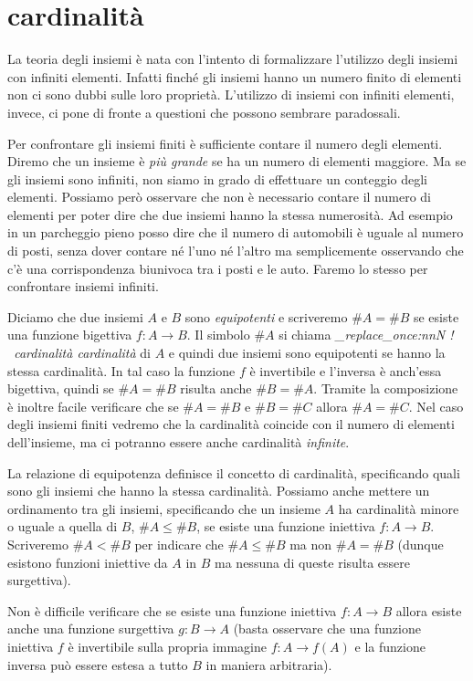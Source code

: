 \documentclass[italian,a4paper,twosides,headinclude]{scrbook}
\newcommand\stripExclamation[1]{
\def\tmp{#1}
\regex_replace_once:nnN { ! } { \  }\tmp
\tmp}
\newcommand{\mynote}[1]{\marginnote{{\footnotesize\stripExclamation{#1}}}}
\newcommand{\myemph}[2][]{%
  \emph{\stripExclamation{#2}}%
  \ifthenelse{\isempty{#1}}%
    {\mynote{#2}%
    \index{#2}}%
    {\mynote{#2}%
     \ifthenelse{\isempty{}}%
      {\index{#2}}%
      {\index{}}}}%
\begin{document}
\section{cardinalità}

La teoria degli insiemi è nata con l'intento di formalizzare l'utilizzo degli
insiemi con infiniti elementi. Infatti finché gli insiemi hanno un numero finito
di elementi non ci sono dubbi sulle loro proprietà. L'utilizzo di insiemi con
infiniti elementi, invece, ci pone di fronte a questioni che possono sembrare
paradossali.

Per confrontare gli insiemi finiti è sufficiente contare il numero degli elementi.
Diremo che un insieme è \emph{più grande} se ha un numero di elementi maggiore.
Ma se gli insiemi sono infiniti, non siamo in grado di effettuare un conteggio
degli elementi. Possiamo però osservare che non è necessario contare il numero
di elementi per poter dire che due insiemi hanno la stessa numerosità.
Ad esempio in un parcheggio pieno posso dire che il numero di automobili
è uguale al numero di posti, senza dover contare né l'uno né l'altro ma semplicemente
osservando che c'è una corrispondenza biunivoca tra i posti e le auto. Faremo
lo stesso per confrontare insiemi infiniti.

Diciamo che due insiemi $A$ e $B$ sono \emph{equipotenti} e scriveremo $\#A = \#B$
\index{\#}%
se esiste una funzione bigettiva $f\colon A \to B$.
Il simbolo $\#A$ si chiama \myemph{cardinalità} di $A$ e quindi due insiemi
sono equipotenti se hanno la stessa cardinalità.
In tal caso la funzione
$f$ è invertibile e l'inversa è anch'essa bigettiva,
quindi se $\#A = \#B$ risulta anche $\#B = \#A$.
Tramite la composizione è inoltre facile verificare che se $\#A = \#B$ e $\#B = \#C$
allora $\#A = \#C$.
Nel caso degli insiemi finiti vedremo che la cardinalità coincide con il
numero di elementi dell'insieme, ma ci potranno essere anche cardinalità
\emph{infinite}.

La relazione di equipotenza definisce il concetto di cardinalità, specificando
quali sono gli insiemi che hanno la stessa cardinalità. Possiamo anche mettere
un ordinamento tra gli insiemi, specificando che un insieme $A$ ha cardinalità
minore o uguale a quella di $B$, $\#A\le \#B$, se esiste una funzione
iniettiva $f\colon A \to B$. Scriveremo $\#A < \#B$ per indicare che
$\#A \le \#B$ ma non $\#A = \#B$ (dunque esistono funzioni iniettive da $A$ in $B$
ma nessuna di queste risulta essere surgettiva).

Non è difficile verificare che se esiste una funzione iniettiva $f\colon A\to B$
allora esiste anche una funzione surgettiva $g\colon B\to A$
(basta osservare che una funzione iniettiva $f$ è invertibile sulla propria
immagine $f\colon A \to f(A)$ e la funzione inversa può essere estesa a
tutto $B$ in maniera arbitraria).
\end{document}
